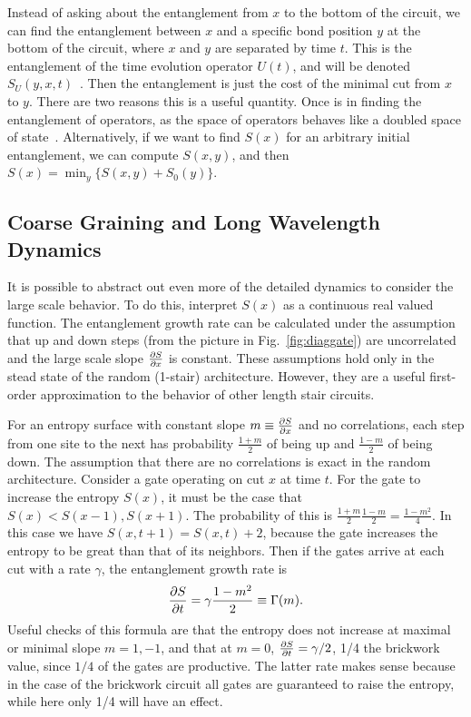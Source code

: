 Instead of asking about the entanglement from $x$ to the bottom of the circuit, we can find the entanglement between $x$ and a specific bond position $y$ at the bottom of the circuit, where $x$ and $y$ are separated by time $t$. This is the entanglement of the time evolution operator $U(t)$, and will be denoted $S_U(y,x,t)$~\cite{Jonay18}. Then the entanglement is just the cost of the minimal cut from $x$ to $y$. There are two reasons this is a useful quantity. Once is in finding the entanglement of operators, as the space of operators behaves like a doubled space of state~\cite{Jonay17, Jonay18}. Alternatively, if we want to find $S(x)$ for an arbitrary initial entanglement, we can compute $S(x,y)$, and then $S(x) = \min_y\{S(x,y) + S_0(y)\}$.

\subsection{Coarse Graining and Long Wavelength Dynamics} \label{sub:coarse}

It is possible to abstract out even more of the detailed dynamics to consider the large scale behavior. To do this, interpret $S(x)$ as a continuous real valued function. The entanglement growth rate can be calculated under the assumption that up and down steps (from the picture in Fig.~\ref{fig:diaggate}) are uncorrelated and the large scale slope $\frac{\partial S}{\partial x}$ is constant. These assumptions hold only in the stead state of the random (1-stair) architecture. However, they are a useful first-order approximation to the behavior of other length stair circuits.

For an entropy surface with constant slope $m\equiv\frac{\partial S}{\partial x}$ and no correlations, each step from one site to the next has probability $\frac{1+m}{2}$ of being up and $\frac{1-m}{2}$ of being down. The assumption that there are no correlations is exact in the random architecture. Consider a gate operating on cut $x$ at time $t$. For the gate to increase the entropy $S(x)$, it must be the case that $S(x)<S(x-1), S(x+1)$. The probability of this is $\frac{1+m}{2} \frac{1-m}{2} = \frac{1-m^2}{4}$. In this case we have $S(x,t+1)=S(x,t)+2$, because the gate increases the entropy to be great than that of its neighbors. Then if the gates arrive at each cut with a rate $\gamma$, the entanglement growth rate is
\begin{align}
\frac{\partial S}{\partial t} = \gamma\frac{1-m^2}{2}\equiv \Gamma(m). \label{eqn:randomgrowthrate}
\end{align}
Useful checks of this formula are that the entropy does not increase at maximal or minimal slope $m=1,-1$, and that at $m=0$, $\frac{\partial S}{\partial t}=\gamma/2$, 1/4 the brickwork value, since $1/4$ of the gates are productive. The latter rate makes sense because in the case of the brickwork circuit all gates are guaranteed to raise the entropy, while here only 1/4 will have an effect.

